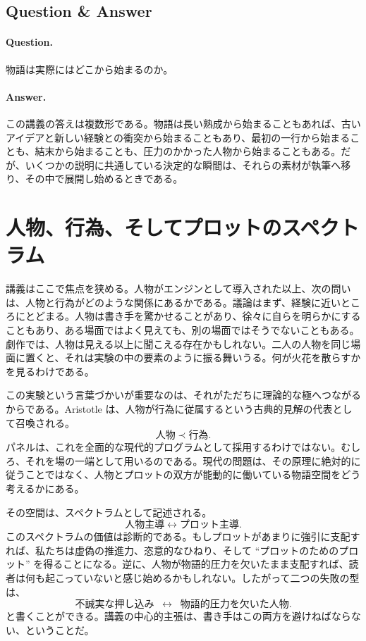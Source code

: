 \subsection{Question \& Answer}

\paragraph{Question.} 物語は実際にはどこから始まるのか。

\paragraph{Answer.} この講義の答えは複数形である。物語は長い熟成から始まることもあれば、古いアイデアと新しい経験との衝突から始まることもあり、最初の一行から始まることも、結末から始まることも、圧力のかかった人物から始まることもある。だが、いくつかの説明に共通している決定的な瞬間は、それらの素材が執筆へ移り、その中で展開し始めるときである。

\section{人物、行為、そしてプロットのスペクトラム}

講義はここで焦点を狭める。人物がエンジンとして導入された以上、次の問いは、人物と行為がどのような関係にあるかである。議論はまず、経験に近いところにとどまる。人物は書き手を驚かせることがあり、徐々に自らを明らかにすることもあり、ある場面ではよく見えても、別の場面ではそうでないこともある。劇作では、人物は見える以上に聞こえる存在かもしれない。二人の人物を同じ場面に置くと、それは実験の中の要素のように振る舞いうる。何が火花を散らすかを見るわけである。

この実験という言葉づかいが重要なのは、それがただちに理論的な極へつながるからである。Aristotle は、人物が行為に従属するという古典的見解の代表として召喚される。
\begin{equation}
\text{人物} \prec \text{行為}.
\end{equation}
パネルは、これを全面的な現代的プログラムとして採用するわけではない。むしろ、それを場の一端として用いるのである。現代の問題は、その原理に絶対的に従うことではなく、人物とプロットの双方が能動的に働いている物語空間をどう考えるかにある。

その空間は、スペクトラムとして記述される。
\begin{equation}
\text{人物主導} \leftrightarrow \text{プロット主導}.
\end{equation}
このスペクトラムの価値は診断的である。もしプロットがあまりに強引に支配すれば、私たちは虚偽の推進力、恣意的なひねり、そして ``プロットのためのプロット'' を得ることになる。逆に、人物が物語的圧力を欠いたまま支配すれば、読者は何も起こっていないと感じ始めるかもしれない。したがって二つの失敗の型は、
\begin{equation}
\text{不誠実な押し込み} \;\;\leftrightarrow\;\; \text{物語的圧力を欠いた人物}.
\end{equation}
と書くことができる。講義の中心的主張は、書き手はこの両方を避けねばならない、ということだ。

